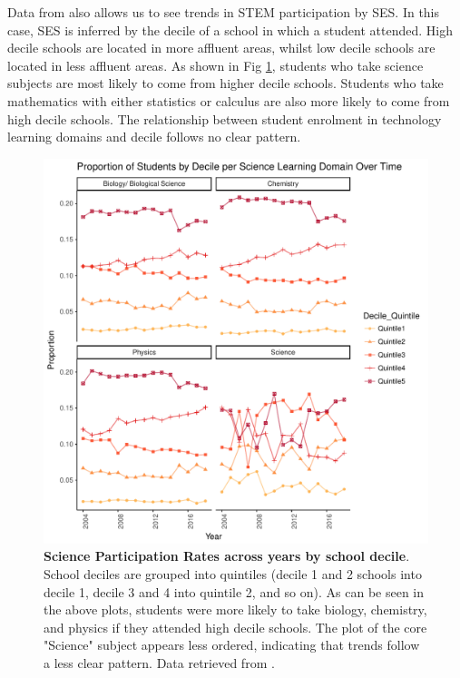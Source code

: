 \documentclass[a4paper]{article}
\begin{document}
Data from \cite{EducationCounts_2018} also allows us to see trends in STEM participation by SES. In this case, SES is inferred by the decile of a school in which a student attended. High decile schools are located in more affluent areas, whilst low decile schools are located in less affluent areas. As shown in Fig \ref{fig:STEM_Participation_Decile}, students who take science subjects are most likely to come from higher decile schools. Students who take mathematics with either statistics or calculus are also more likely to come from high decile schools. The relationship between student enrolment in technology learning domains and decile follows no clear pattern.  
\begin{figure}
    \centering
    \includegraphics{STEM_Participation_Y13_Proportion_Science_DecileQuintile.pdf}
    \caption{\textbf{Science Participation Rates across years by school decile}. School deciles are grouped into quintiles (decile 1 and 2 schools into decile 1, decile 3 and 4 into quintile 2, and so on). As can be seen in the above plots, students were more likely to take biology, chemistry, and physics if they attended high decile schools. The plot of the core "Science" subject appears less ordered, indicating that trends follow a less clear pattern. Data retrieved from \cite{EducationCounts_2018}.}
    \label{fig:STEM_Participation_Decile}
\end{figure}
\end{document}
